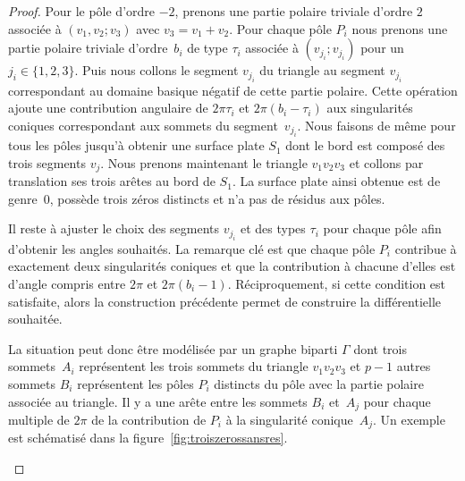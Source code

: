 \documentclass[JEP,XML,SOM,Unicode,francais,NoFloatCountersInSection,published]{cedram}
\theoremstyle{definition}
\begin{document}
\begin{proof}
Pour le pôle d'ordre $-2$, prenons une partie polaire triviale d'ordre $2$ associée à $(v_{1},v_{2};v_{3})$ avec $v_{3}=v_{1}+v_{2}$. Pour chaque pôle $P_{i}$ nous prenons une partie polaire triviale d'ordre~$b_{i}$ de type $\tau_{i}$ associée à $(v_{j_{i}};v_{j_{i}})$ pour un $j_{i}\in\lbrace 1,2,3 \rbrace$. Puis nous collons le segment $v_{j_{i}}$ du triangle au segment $v_{j_{i}}$ correspondant au domaine basique négatif de cette partie polaire. Cette opération ajoute une contribution angulaire de $2\pi\tau_{i}$ et $2\pi(b_{i}-\tau_{i})$ aux singularités coniques correspondant aux sommets du segment~$v_{j_{i}}$. Nous faisons de même pour tous les pôles jusqu'à obtenir une surface plate $S_{1}$ dont le bord est composé des trois segments $v_{j}$. Nous prenons maintenant le triangle $v_{1}v_{2}v_{3}$ et collons par translation ses trois arêtes au bord de $S_{1}$.
La surface plate ainsi obtenue est de genre~$0$, possède trois zéros distincts et n'a pas de résidus aux pôles.
\par
Il reste à ajuster le choix des segments $v_{j_{i}}$ et des types $\tau_{i}$ pour chaque pôle afin d'obtenir les angles souhaités. La remarque clé est que chaque pôle $P_{i}$ contribue à exactement deux singularités coniques et que la contribution à chacune d'elles est d'angle compris entre $2\pi$ et $2\pi(b_{i}-1)$. Réciproquement, si cette condition est satisfaite, alors la construction précédente permet de construire la différentielle souhaitée.
\par
La situation peut donc être modélisée par un graphe biparti $\Gamma$ dont trois sommets~$A_{i}$ représentent les trois sommets du triangle $v_{1}v_{2}v_{3}$ et $p-1$ autres sommets $B_{i}$ représentent les pôles $P_{i}$ distincts du pôle avec la partie polaire associée au triangle. Il y a une arête entre les sommets $B_{i}$ et~$A_{j}$ pour chaque multiple de $2\pi$ de la contribution de $P_{i}$ à la singularité conique~$A_{j}$. Un exemple est schématisé dans la figure~\ref{fig:troiszerossansres}.
\begin{figure}[htb]
\center
{}
\end{figure}
\end{proof}
\end{document}
